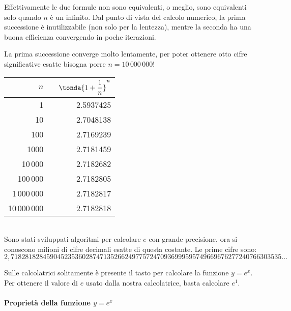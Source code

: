 \begin{minipage}{.49\textwidth}
Effettivamente le due formule non sono equivalenti, o meglio, sono 
equivalenti solo quando \(n\) è un infinito.
Dal punto di vista del calcolo numerico, la prima successione è 
inutilizzabile (non solo per la lentezza), mentre la seconda ha una buona 
efficienza convergendo in poche iterazioni.

La prima successione converge molto lentamente, per poter ottenere otto 
cifre significative esatte bisogna porre \(n = 10\,000\,000\)!
\end{minipage}
\hfill
\begin{minipage}{.49\textwidth}
\begin{center}
\begin{tabular}{rr}
\(\quad n\) &
\(\quad \tonda{1+\dfrac{1}{n}}^n\) \\
\hline
1 &  2.5937425 \\
10 &  2.7048138 \\
100 &  2.7169239 \\
1000 &  2.7181459 \\
10\,000 &  2.7182682 \\
100\,000 &  2.7182805 \\
1\,000\,000 &  2.7182817 \\
10\,000\,000 &  2.7182818 \\
\end{tabular}
\end{center}
\end{minipage}\\

Sono stati sviluppati algoritmi per calcolare \(e\) con grande precisione, 
ora si conoscono milioni di cifre decimali esatte di questa costante.
Le prime cifre sono:
\[2,71828182845904523536028747135266249775724709369995957
49669676277240766303535\dots\]

Sulle calcolatrici solitamente è presente il tasto per calcolare la 
funzione \(y = e^x\). Per ottenere il valore di \(e\) usato dalla nostra 
calcolatrice, basta calcolare \(e^1\).

\paragraph{Proprietà della funzione \(y=e^x\)}
~
\nopagebreak

